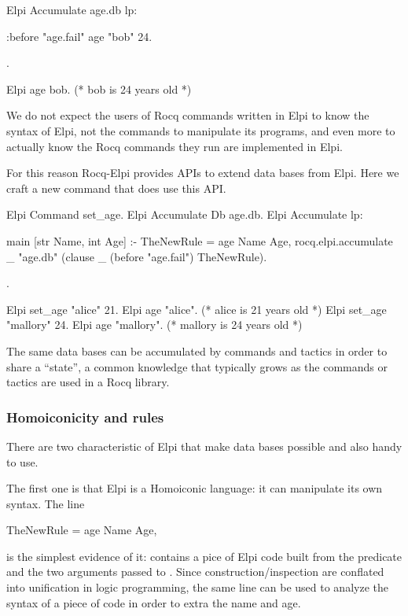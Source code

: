 \documentclass[a4paper, 11pt]{book}
\begin{document}
\begin{rocqcode}
Elpi Accumulate age.db lp:{{

  :before "age.fail"     %
  age "bob" 24.

}}.

Elpi age bob. (* bob is 24 years old *)
\end{rocqcode}

We do not expect the users of Rocq commands written in Elpi to know the
syntax of Elpi, not the commands to manipulate its programs, and even more
to actually know the Rocq commands they run are implemented in Elpi.

For this reason Rocq-Elpi provides APIs to extend data bases from Elpi.
Here we craft a new command  that does use this API.

\begin{rocqcode}
Elpi Command set_age.
Elpi Accumulate Db age.db.
Elpi Accumulate lp:{{

  main [str Name, int Age] :-
    TheNewRule = age Name Age,
    rocq.elpi.accumulate _ "age.db"
      (clause _ (before "age.fail") TheNewRule).

}}.

Elpi set_age "alice" 21.
Elpi age "alice". (* alice is 21 years old *)
Elpi set_age "mallory" 24.
Elpi age "mallory". (* mallory is 24 years old *)
\end{rocqcode}

The same data bases can be accumulated by commands and tactics in order
to share a ``state'', a common knowledge that typically grows as the
commands or tactics are used in a Rocq library.

\subsubsection{Homoiconicity and rules}

There are two characteristic of Elpi that make data bases possible and also
handy to use.

The first one is that Elpi is a Homoiconic language: it can manipulate its own
syntax. The line

\begin{elpicode}
TheNewRule = age Name Age,
\end{elpicode}

is the simplest evidence of it:  contains a pice
of Elpi code built from the  predicate and the two arguments
passed to . Since construction/inspection are conflated
into unification in logic programming, the same line can be used to analyze the
syntax of a piece of code in order to extra the name and age.
\end{document}
